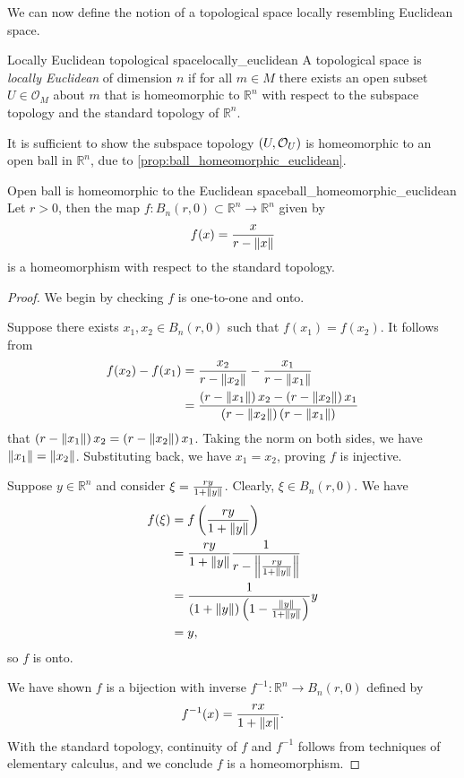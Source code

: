 We can now define the notion of a topological space locally resembling Euclidean space.
\begin{definition}{Locally Euclidean topological space}{locally_euclidean}
    A topological space  is \emph{locally Euclidean} of dimension \(n\) if for all \(m \in M\) there exists an open subset \(U \in \mathcal{O}_M\) about \(m\) that is homeomorphic to \(\mathbb{R}^n\) with respect to the subspace topology and the standard topology of \(\mathbb{R}^n\).
\end{definition}
It is sufficient to show the subspace topology \(\topology{U}\) is homeomorphic to an open ball in \(\mathbb{R}^n\), due to \cref{prop:ball_homeomorphic_euclidean}.
\begin{proposition}{Open ball is homeomorphic to the Euclidean space}{ball_homeomorphic_euclidean}
    Let \(r > 0\), then the map \(f : B_n(r, 0)\subset\mathbb{R}^n\to\mathbb{R}^n\) given by
    \[f(x) = \frac{x}{r - \norm{x}}\]
    is a homeomorphism with respect to the standard topology.
\end{proposition}
\begin{proof}
    We begin by checking \(f\) is one-to-one and onto.

    Suppose there exists \(x_1, x_2 \in B_n(r, 0)\) such that \(f(x_1) = f(x_2)\). It follows from
    \begin{align*}
        f(x_2) - f(x_1) &= \frac{x_2}{r - \norm{x_2}} - \frac{x_1}{r - \norm{x_1}}\\
                        &= \frac{\left(r - \norm{x_1}\right)x_2 - \left(r - \norm{x_2}\right)x_1}{\left(r - \norm{x_2}\right)\left(r - \norm{x_1}\right)}
    \end{align*}
    that \(\left(r - \norm{x_1}\right)x_2 = \left(r - \norm{x_2}\right)x_1\). Taking the norm on both sides, we have \(\norm{x_1} = \norm{x_2}\). Substituting back, we have \(x_1 = x_2\), proving \(f\) is injective.

    Suppose \(y \in \mathbb{R}^n\) and consider \(\xi = \frac{ry}{1 + \norm{y}}\). Clearly, \(\xi \in B_n(r,0)\). We have
    \begin{align*}
        f(\xi) &= f\left(\frac{ry}{1 + \norm{y}}\right)\\
               &= \frac{ry}{1 + \norm{y}} \frac{1}{r - \norm*{\frac{ry}{1 + \norm{y}}}}\\
               &= \frac{1}{\left(1 + \norm{y}\right)\left(1 - \frac{\norm{y}}{1 + \norm{y}}\right)} y\\
               &= y,
    \end{align*}
    so \(f\) is onto.

    We have shown \(f\) is a bijection with inverse \(f^{-1} : \mathbb{R}^n \to B_n(r, 0)\) defined by
    \begin{equation}
        f^{-1}(x) = \frac{rx}{1 + \norm{x}}.
    \end{equation}
    With the standard topology, continuity of \(f\) and \(f^{-1}\) follows from techniques of elementary calculus, and we conclude \(f\) is a homeomorphism.
\end{proof}

